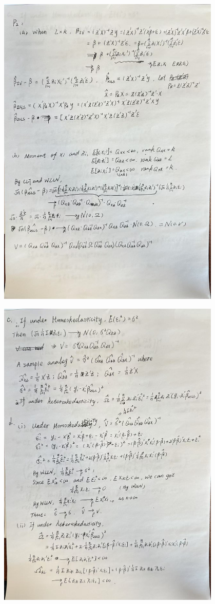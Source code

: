 \documentclass[12pt, oneside]{article}
\begin{document}
\begin{center}

    \includegraphics[width=0.8\textwidth]{Figure/P2.1.jpg}

    \includegraphics[width=0.8\textwidth]{Figure/P2.2.jpg}
\end{center}
\end{document}
